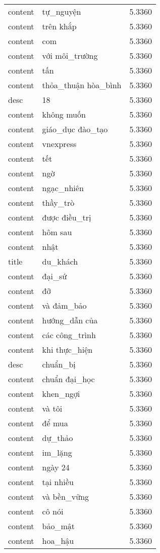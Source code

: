 \documentclass{article}
\begin{document}
\begin{tabular}{lll}
content & tự\_nguyện & 5.3360\\
content & trên khắp & 5.3360\\
content & com & 5.3360\\
content & với môi\_trường & 5.3360\\
content & tấn & 5.3360\\
content & thỏa\_thuận hòa\_bình & 5.3360\\
desc & 18 & 5.3360\\
content & không muốn & 5.3360\\
content & giáo\_dục đào\_tạo & 5.3360\\
content & vnexpress & 5.3360\\
content & tết & 5.3360\\
content & ngờ & 5.3360\\
content & ngạc\_nhiên & 5.3360\\
content & thầy\_trò & 5.3360\\
content & được điều\_trị & 5.3360\\
content & hôm sau & 5.3360\\
content & nhật & 5.3360\\
title & du\_khách & 5.3360\\
content & đại\_sứ & 5.3360\\
content & đỡ & 5.3360\\
content & và đảm\_bảo & 5.3360\\
content & hướng\_dẫn của & 5.3360\\
content & các công\_trình & 5.3360\\
content & khi thực\_hiện & 5.3360\\
desc & chuẩn\_bị & 5.3360\\
content & chuẩn đại\_học & 5.3360\\
content & khen\_ngợi & 5.3360\\
content & và tôi & 5.3360\\
content & để mua & 5.3360\\
content & dự\_thảo & 5.3360\\
content & im\_lặng & 5.3360\\
content & ngày 24 & 5.3360\\
content & tại nhiều & 5.3360\\
content & và bền\_vững & 5.3360\\
content & cô nói & 5.3360\\
content & bảo\_mật & 5.3360\\
content & hoa\_hậu & 5.3360\\

\end{tabular}
\end{document}
